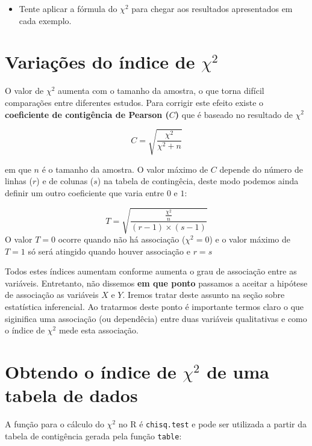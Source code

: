 \documentclass[
]{book}
\providecommand{\tightlist}{%
  \setlength{\itemsep}{0pt}\setlength{\parskip}{0pt}}
\begin{document}
\begin{itemize}
\tightlist
\item
  Tente aplicar a fórmula do \(\chi^2\) para chegar aos resultados apresentados em cada exemplo.
\end{itemize}

\hypertarget{variauxe7uxf5es-do-uxedndice-de-chi2}{%
\section{\texorpdfstring{Variações do índice de \(\chi^2\)}{Variações do índice de \textbackslash chi\^{}2}}\label{variauxe7uxf5es-do-uxedndice-de-chi2}}

O valor de \(\chi^2\) aumenta com o tamanho da amostra, o que torna difícil comparações entre diferentes estudos. Para corrigir este efeito existe o \textbf{coeficiente de contigência de Pearson (\(C\))} que é baseado no resultado de \(\chi^2\)

\[C = \sqrt{\frac{\chi^2}{\chi^2 + n}}\]

em que \(n\) é o tamanho da amostra. O valor máximo de \(C\) depende do número de linhas (\(r\)) e de colunas (\(s\)) na tabela de contingêcia, deste modo podemos ainda definir um outro coeficiente que varia entre \(0\) e \(1\):

\[T = \sqrt{\frac{\frac{\chi^2}{n}}{(r-1) \times (s-1)}}\]
O valor \(T = 0\) ocorre quando não há associação (\(\chi^2 = 0\)) e o valor máximo de \(T = 1\) só será atingido quando houver associação e \(r = s\)

Todos estes índices aumentam conforme aumenta o grau de associação entre as variáveis. Entretanto, não dissemos \textbf{em que ponto} passamos a aceitar a hipótese de associação as variáveis \(X\) e \(Y\). Iremos tratar deste assunto na seção sobre estatística inferencial. Ao tratarmos deste ponto é importante termos claro o que siginifica uma associação (ou dependêcia) entre duas variáveis qualitativas e como o índice de \(\chi^2\) mede esta associação.

\hypertarget{obtendo-o-uxedndice-de-chi2-de-uma-tabela-de-dados}{%
\section{\texorpdfstring{Obtendo o índice de \(\chi^2\) de uma tabela de dados}{Obtendo o índice de \textbackslash chi\^{}2 de uma tabela de dados}}\label{obtendo-o-uxedndice-de-chi2-de-uma-tabela-de-dados}}

A função para o cálculo do \(\chi^2\) no R é \texttt{chisq.test} e pode ser utilizada a partir da tabela de contigência gerada pela função \texttt{table}:
\end{document}
